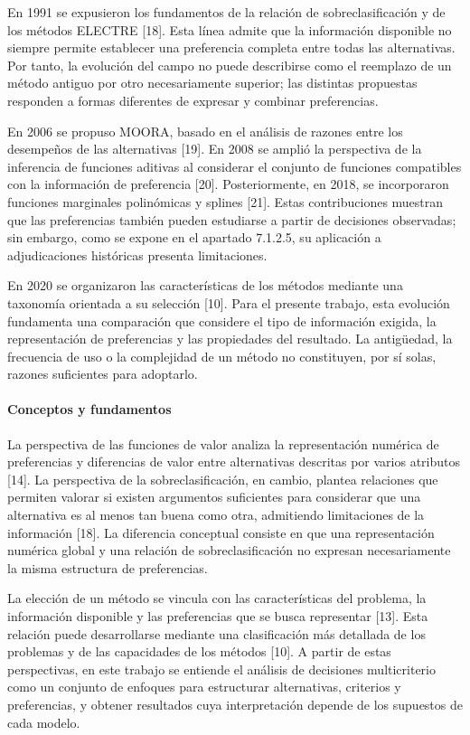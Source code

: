 \documentclass[12pt,a4paper]{article}
\begin{document}
En 1991 se expusieron los fundamentos de la relación de sobreclasificación y de los métodos ELECTRE [18]. Esta línea admite que la información disponible no siempre permite establecer una preferencia completa entre todas las alternativas. Por tanto, la evolución del campo no puede describirse como el reemplazo de un método antiguo por otro necesariamente superior; las distintas propuestas responden a formas diferentes de expresar y combinar preferencias.

En 2006 se propuso MOORA, basado en el análisis de razones entre los desempeños de las alternativas [19]. En 2008 se amplió la perspectiva de la inferencia de funciones aditivas al considerar el conjunto de funciones compatibles con la información de preferencia [20]. Posteriormente, en 2018, se incorporaron funciones marginales polinómicas y splines [21]. Estas contribuciones muestran que las preferencias también pueden estudiarse a partir de decisiones observadas; sin embargo, como se expone en el apartado 7.1.2.5, su aplicación a adjudicaciones históricas presenta limitaciones.

En 2020 se organizaron las características de los métodos mediante una taxonomía orientada a su selección [10]. Para el presente trabajo, esta evolución fundamenta una comparación que considere el tipo de información exigida, la representación de preferencias y las propiedades del resultado. La antigüedad, la frecuencia de uso o la complejidad de un método no constituyen, por sí solas, razones suficientes para adoptarlo.

\paragraph{Conceptos y fundamentos}

La perspectiva de las funciones de valor analiza la representación numérica de preferencias y diferencias de valor entre alternativas descritas por varios atributos [14]. La perspectiva de la sobreclasificación, en cambio, plantea relaciones que permiten valorar si existen argumentos suficientes para considerar que una alternativa es al menos tan buena como otra, admitiendo limitaciones de la información [18]. La diferencia conceptual consiste en que una representación numérica global y una relación de sobreclasificación no expresan necesariamente la misma estructura de preferencias.

La elección de un método se vincula con las características del problema, la información disponible y las preferencias que se busca representar [13]. Esta relación puede desarrollarse mediante una clasificación más detallada de los problemas y de las capacidades de los métodos [10]. A partir de estas perspectivas, en este trabajo se entiende el análisis de decisiones multicriterio como un conjunto de enfoques para estructurar alternativas, criterios y preferencias, y obtener resultados cuya interpretación depende de los supuestos de cada modelo.
\end{document}
